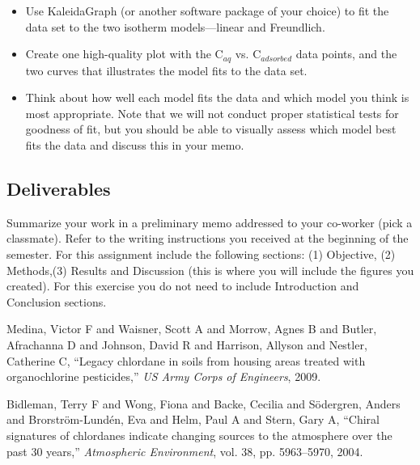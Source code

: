 \documentclass[12pt,letterpaper]{article}
\begin{document}
\begin{itemize} 
\item Use KaleidaGraph (or another software package of your choice) to fit the data set to  the two isotherm models---linear and Freundlich.
\item Create one high-quality plot with the C$_{aq}$ vs. C$_{adsorbed}$ data points, and the two curves that illustrates the model fits to the data set. 
\item Think about how well each model fits the data and which model you think is most  appropriate. Note that we will not conduct proper statistical tests for goodness of fit, but you should be able to visually assess which model best fits the data and discuss this in your memo.
 
\end{itemize}


\subsection *{Deliverables}
Summarize your work in a preliminary memo addressed to your co-worker (pick a classmate).  Refer to the writing instructions you received at the beginning of the semester.  For this assignment include the following sections: (1) Objective, (2) Methods,(3) Results and Discussion (this is where you will include the figures you created).  For this exercise you do not need to include Introduction and Conclusion sections.\\



\begin{thebibliography}{9}



Medina, Victor F and Waisner, Scott A and Morrow, Agnes B and Butler, Afrachanna D and Johnson, David R and Harrison, Allyson and Nestler, Catherine C,
``Legacy chlordane in soils from housing areas treated with organochlorine pesticides,''
\emph{US Army Corps of Engineers}, 2009.


Bidleman, Terry F and Wong, Fiona and Backe, Cecilia and S{\"o}dergren, Anders and Brorstr{\"o}m-Lund{\'e}n, Eva and Helm, Paul A and Stern, Gary A,
``Chiral signatures of chlordanes indicate changing sources to the atmosphere over the past 30 years,''
\emph{Atmospheric Environment}, vol. 38, pp. 5963--5970, 2004.

 

\end{thebibliography}
\pagebreak
\end{document}
